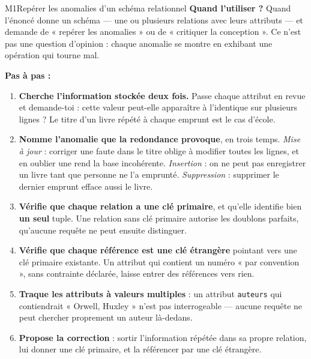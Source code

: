 \begin{fichemethode}{M1}{Repérer les anomalies d'un schéma relationnel}
\textbf{Quand l'utiliser ?} Quand l'énoncé donne un schéma — une ou plusieurs relations avec
leurs attributs — et demande de « repérer les anomalies » ou de « critiquer la conception ».
Ce n'est pas une question d'opinion : chaque anomalie se montre en exhibant une opération qui
tourne mal.

\textbf{Pas à pas :}
\begin{enumerate}
  \item \textbf{Cherche l'information stockée deux fois.} Passe chaque attribut en revue et
    demande-toi : cette valeur peut-elle apparaître à l'identique sur plusieurs lignes ? Le
    titre d'un livre répété à chaque emprunt est le cas d'école.
  \item \textbf{Nomme l'anomalie que la redondance provoque}, en trois temps. \emph{Mise à
    jour} : corriger une faute dans le titre oblige à modifier toutes les lignes, et en
    oublier une rend la base incohérente. \emph{Insertion} : on ne peut pas enregistrer un
    livre tant que personne ne l'a emprunté. \emph{Suppression} : supprimer le dernier
    emprunt efface aussi le livre.
  \item \textbf{Vérifie que chaque relation a une clé primaire}, et qu'elle identifie bien
    \textbf{un seul} tuple. Une relation sans clé primaire autorise les doublons parfaits,
    qu'aucune requête ne peut ensuite distinguer.
  \item \textbf{Vérifie que chaque référence est une clé étrangère} pointant vers une clé
    primaire existante. Un attribut qui contient un numéro « par convention », sans contrainte
    déclarée, laisse entrer des références vers rien.
  \item \textbf{Traque les attributs à valeurs multiples} : un attribut \texttt{auteurs} qui
    contiendrait « Orwell, Huxley » n'est pas interrogeable — aucune requête ne peut chercher
    proprement un auteur là-dedans.
  \item \textbf{Propose la correction} : sortir l'information répétée dans sa propre relation,
    lui donner une clé primaire, et la référencer par une clé étrangère.
\end{enumerate}


\end{fichemethode}
